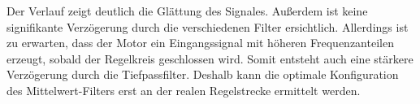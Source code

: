 Der Verlauf zeigt deutlich die Glättung des Signales. Außerdem ist keine signifikante Verzögerung durch die verschiedenen Filter ersichtlich. Allerdings ist zu erwarten, dass der Motor ein Eingangssignal mit höheren Frequenzanteilen erzeugt, sobald der Regelkreis geschlossen wird. Somit entsteht auch eine stärkere Verzögerung durch die Tiefpassfilter. Deshalb kann die optimale Konfiguration des Mittelwert-Filters erst an der realen Regelstrecke ermittelt werden.